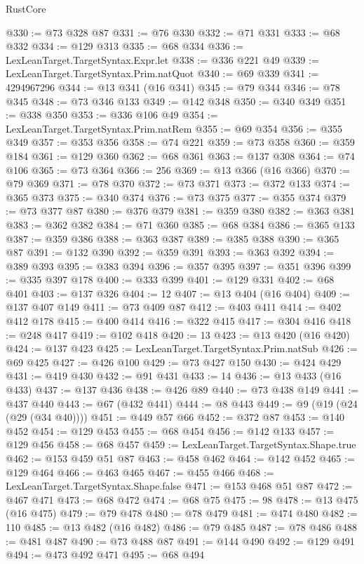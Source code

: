 \begin{lexlean}{RustCore}
\begin{coremodule}
@330 := @73 @328 @87
@331 := @76 @330
@332 := @71 @331
@333 := @68 @332
@334 := @129 @313
@335 := @68 @334
@336 := LexLeanTarget.TargetSyntax.Expr.let
@338 := @336 @221 @49
@339 := LexLeanTarget.TargetSyntax.Prim.natQuot
@340 := @69 @339
@341 := 4294967296
@344 := @13 @341 (@16 @341)
@345 := @79 @344
@346 := @78 @345
@348 := @73 @346 @133
@349 := @142 @348
@350 := @340 @349
@351 := @338 @350
@353 := @336 @106 @49
@354 := LexLeanTarget.TargetSyntax.Prim.natRem
@355 := @69 @354
@356 := @355 @349
@357 := @353 @356
@358 := @74 @221
@359 := @73 @358
@360 := @359 @184
@361 := @129 @360
@362 := @68 @361
@363 := @137 @308
@364 := @74 @106
@365 := @73 @364
@366 := 256
@369 := @13 @366 (@16 @366)
@370 := @79 @369
@371 := @78 @370
@372 := @73 @371
@373 := @372 @133
@374 := @365 @373
@375 := @340 @374
@376 := @73 @375
@377 := @355 @374
@379 := @73 @377 @87
@380 := @376 @379
@381 := @359 @380
@382 := @363 @381
@383 := @362 @382
@384 := @71 @360
@385 := @68 @384
@386 := @365 @133
@387 := @359 @386
@388 := @363 @387
@389 := @385 @388
@390 := @365 @87
@391 := @132 @390
@392 := @359 @391
@393 := @363 @392
@394 := @389 @393
@395 := @383 @394
@396 := @357 @395
@397 := @351 @396
@399 := @335 @397 @178
@400 := @333 @399
@401 := @129 @331
@402 := @68 @401
@403 := @137 @326
@404 := 12
@407 := @13 @404 (@16 @404)
@409 := @137 @407 @149
@411 := @73 @409 @87
@412 := @403 @411
@414 := @402 @412 @178
@415 := @400 @414
@416 := @322 @415
@417 := @304 @416
@418 := @248 @417
@419 := @102 @418
@420 := 13
@423 := @13 @420 (@16 @420)
@424 := @137 @423
@425 := LexLeanTarget.TargetSyntax.Prim.natSub
@426 := @69 @425
@427 := @426 @100
@429 := @73 @427 @150
@430 := @424 @429
@431 := @419 @430
@432 := @91 @431
@433 := 14
@436 := @13 @433 (@16 @433)
@437 := @137 @436
@438 := @426 @89
@440 := @73 @438 @149
@441 := @437 @440
@443 := @67 (@432 @441)
@444 := @8 @443
@449 := @9 (@19 (@24 (@29 (@34 @40))))
@451 := @449 @57 @66
@452 := @372 @87
@453 := @140 @452
@454 := @129 @453
@455 := @68 @454
@456 := @142 @133
@457 := @129 @456
@458 := @68 @457
@459 := LexLeanTarget.TargetSyntax.Shape.true
@462 := @153 @459 @51 @87
@463 := @458 @462
@464 := @142 @452
@465 := @129 @464
@466 := @463 @465
@467 := @455 @466
@468 := LexLeanTarget.TargetSyntax.Shape.false
@471 := @153 @468 @51 @87
@472 := @467 @471
@473 := @68 @472
@474 := @68 @75
@475 := 98
@478 := @13 @475 (@16 @475)
@479 := @79 @478
@480 := @78 @479
@481 := @474 @480
@482 := 110
@485 := @13 @482 (@16 @482)
@486 := @79 @485
@487 := @78 @486
@488 := @481 @487
@490 := @73 @488 @87
@491 := @144 @490
@492 := @129 @491
@494 := @473 @492 @471
@495 := @68 @494

\end{coremodule}
\end{lexlean}
